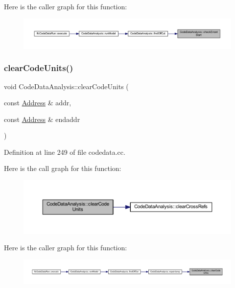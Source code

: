 Here is the caller graph for this function\+:
\nopagebreak
\begin{figure}[H]
\begin{center}
\leavevmode
\includegraphics[width=350pt]{class_code_data_analysis_ab41f0acf673f7cff1aac362a5be63899_icgraph}
\end{center}
\end{figure}
\mbox{\label{class_code_data_analysis_afa5b4f6f0ba4c12e7700fbf5738c32e7}} 
\subsubsection{\texorpdfstring{clearCodeUnits()}{clearCodeUnits()}}
{\footnotesize\ttfamily void Code\+Data\+Analysis\+::clear\+Code\+Units (\begin{DoxyParamCaption}\item[{const \mbox{\hyperlink{class_address}{Address}} \&}]{addr,  }\item[{const \mbox{\hyperlink{class_address}{Address}} \&}]{endaddr }\end{DoxyParamCaption})}



Definition at line 249 of file codedata.\+cc.

Here is the call graph for this function\+:
\nopagebreak
\begin{figure}[H]
\begin{center}
\leavevmode
\includegraphics[width=350pt]{class_code_data_analysis_afa5b4f6f0ba4c12e7700fbf5738c32e7_cgraph}
\end{center}
\end{figure}
Here is the caller graph for this function\+:
\nopagebreak
\begin{figure}[H]
\begin{center}
\leavevmode
\includegraphics[width=350pt]{class_code_data_analysis_afa5b4f6f0ba4c12e7700fbf5738c32e7_icgraph}
\end{center}
\end{figure}
\mbox{\label{class_code_data_analysis_a0a06f9379e9589429827bd9aa4cd8b0a}} 
